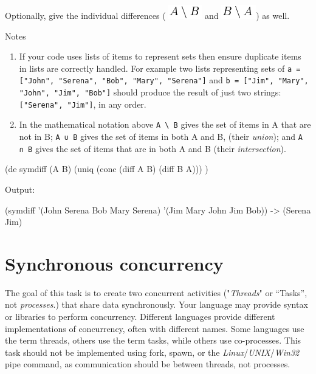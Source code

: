 \begin{itemize}
Optionally, give the individual differences
( \includegraphics[scale=.6]{graphics/2958d3ea0159c6ad2ed45f5804fce621.png}
and  
 \includegraphics[scale=.6]{graphics/07915cb82d7470aff79636e93397abe3.png})
as well.

Notes

\begin{enumerate}
\item If your code uses lists of items to represent sets then ensure
  duplicate items in lists are correctly handled. For example two
  lists representing sets of \texttt{a = {[}"John", "Serena", "Bob",
    "Mary", }\texttt{"Serena"{]}} and \texttt{b = {[}"Jim", "Mary",
    "John", "Jim", "Bob"{]}} should produce the result of just two
  strings: \texttt{{[}"Serena", "Jim"{]}}, in any order.
\item
  In the mathematical notation above \texttt{A \textbackslash{} B} gives
  the set of items in A that are not in B; \texttt{A ∪ B} gives the set
  of items in both A and B, (their \emph{union}); and \texttt{A ∩ B}
  gives the set of items that are in both A and B (their
  \emph{intersection}).
\end{enumerate}



\begin{wideverbatim}

(de symdiff (A B)
   (uniq (conc (diff A B) (diff B A))) )

Output:

(symdiff '(John Serena Bob Mary Serena) '(Jim Mary John Jim Bob))
-> (Serena Jim)

\end{wideverbatim}

\pagebreak{}
\section*{Synchronous concurrency}


The goal of this task is to create two concurrent activities
("\emph{Threads}" or ``Tasks'', not \emph{processes}.) that share data
synchronously. Your language may provide syntax or libraries to
perform concurrency. Different languages provide different
implementations of concurrency, often with different names. Some
languages use the term threads, others use the term tasks, while
others use co-processes. This task should not be implemented using
fork, spawn, or the \emph{Linux}/\emph{UNIX}/\emph{Win32} pipe
command, as communication should be between threads, not processes.


\end{itemize}
